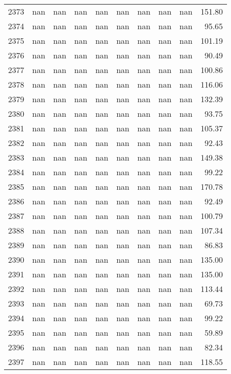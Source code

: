\begin{tabular}{lrrrrrrrrr}
2373 & nan & nan & nan & nan & nan & nan & nan & nan & 151.80 \\
2374 & nan & nan & nan & nan & nan & nan & nan & nan & 95.65 \\
2375 & nan & nan & nan & nan & nan & nan & nan & nan & 101.19 \\
2376 & nan & nan & nan & nan & nan & nan & nan & nan & 90.49 \\
2377 & nan & nan & nan & nan & nan & nan & nan & nan & 100.86 \\
2378 & nan & nan & nan & nan & nan & nan & nan & nan & 116.06 \\
2379 & nan & nan & nan & nan & nan & nan & nan & nan & 132.39 \\
2380 & nan & nan & nan & nan & nan & nan & nan & nan & 93.75 \\
2381 & nan & nan & nan & nan & nan & nan & nan & nan & 105.37 \\
2382 & nan & nan & nan & nan & nan & nan & nan & nan & 92.43 \\
2383 & nan & nan & nan & nan & nan & nan & nan & nan & 149.38 \\
2384 & nan & nan & nan & nan & nan & nan & nan & nan & 99.22 \\
2385 & nan & nan & nan & nan & nan & nan & nan & nan & 170.78 \\
2386 & nan & nan & nan & nan & nan & nan & nan & nan & 92.49 \\
2387 & nan & nan & nan & nan & nan & nan & nan & nan & 100.79 \\
2388 & nan & nan & nan & nan & nan & nan & nan & nan & 107.34 \\
2389 & nan & nan & nan & nan & nan & nan & nan & nan & 86.83 \\
2390 & nan & nan & nan & nan & nan & nan & nan & nan & 135.00 \\
2391 & nan & nan & nan & nan & nan & nan & nan & nan & 135.00 \\
2392 & nan & nan & nan & nan & nan & nan & nan & nan & 113.44 \\
2393 & nan & nan & nan & nan & nan & nan & nan & nan & 69.73 \\
2394 & nan & nan & nan & nan & nan & nan & nan & nan & 99.22 \\
2395 & nan & nan & nan & nan & nan & nan & nan & nan & 59.89 \\
2396 & nan & nan & nan & nan & nan & nan & nan & nan & 82.34 \\
2397 & nan & nan & nan & nan & nan & nan & nan & nan & 118.55 \\

\end{tabular}
